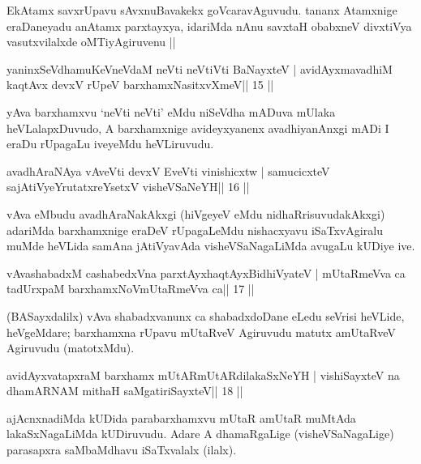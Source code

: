 \begin{artha}
EkAtamx savxrUpavu sAvxnuBavakekx goVcaravAguvudu. tananx Atamxnige
eraDaneyadu anAtamx parxtayxya, idariMda nAnu savxtaH obabxneV
divxtiVya vasutxvilalxde oMTiyAgiruvenu || 
\end{artha}



\begin{shl}
yaninxSeVdhamuKeVneVdaM neVti neVtiVti BaNayxteV |
avidAyxmavadhiM kaqtAvx devxV rUpeV barxhamxNasitxvXmeV\hfill || 15 ||
\end{shl}

\begin{artha}
yAva barxhamxvu `neVti neVti' eMdu niSeVdha mADuva mUlaka heVLalapxDuvudo, A barxhamxnige avideyxyanenx avadhiyanAnxgi mADi I eraDu rUpagaLu iveyeMdu heVLiruvudu.
\end{artha}



\begin{shl}
avadhAraNAya vAveVti devxV EveVti vinishicxtw |
samucicxteV sajAtiVyeYrutatxreYsetxV visheVSaNeYH\hfill || 16 ||
\end{shl}

\begin{artha}
vAva eMbudu avadhAraNakAkxgi (hiVgeyeV eMdu nidhaRrisuvudakAkxgi) adariMda barxhamxnige eraDeV rUpagaLeMdu nishacxyavu iSaTxvAgiralu muMde heVLida samAna jAtiVyavAda visheVSaNagaLiMda avugaLu kUDiye ive.
\end{artha}

\begin{shl}
vAvashabadxM cashabedxVna parxtAyxhaqtAyxBidhiVyateV |
mUtaRmeVva ca tadUrxpaM barxhamxNoV\s mUtaRmeVva ca\hfill || 17 ||
\end{shl}

\begin{artha}
(BASayxdalilx) vAva shabadxvanunx ca shabadxdoDane eLedu seVrisi   heVLide, heVgeMdare; barxhamxna rUpavu mUtaRveV Agiruvudu matutx amUtaRveV Agiruvudu (matotxMdu).
\end{artha}

\begin{shl}
avidAyxvatapxraM barxhamx mUtARmUtARdilakaSxNeYH |
vishiSayxteV na dhamARNAM mithaH saMgatiriSayxteV\hfill || 18 ||
\end{shl}

\begin{artha}
ajAcnxnadiMda kUDida parabarxhamxvu mUtaR amUtaR muMtAda
lakaSxNagaLiMda kUDiruvudu. Adare A dhamaRgaLige (visheVSaNagaLige)
parasapxra saMbaMdhavu iSaTxvalalx (ilalx). 
\end{artha}

